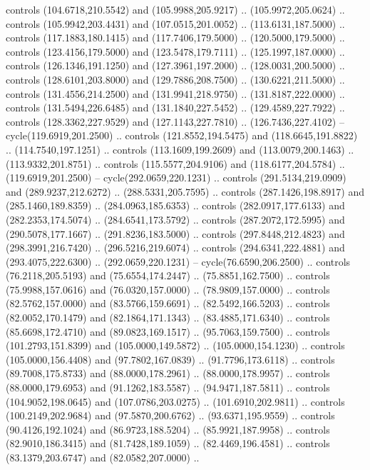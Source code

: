   controls (104.6718,210.5542) and (105.9988,205.9217) .. (105.9972,205.0624) ..
  controls (105.9942,203.4431) and (107.0515,201.0052) .. (113.6131,187.5000) ..
  controls (117.1883,180.1415) and (117.7406,179.5000) .. (120.5000,179.5000) ..
  controls (123.4156,179.5000) and (123.5478,179.7111) .. (125.1997,187.0000) ..
  controls (126.1346,191.1250) and (127.3961,197.2000) .. (128.0031,200.5000) ..
  controls (128.6101,203.8000) and (129.7886,208.7500) .. (130.6221,211.5000) ..
  controls (131.4556,214.2500) and (131.9941,218.9750) .. (131.8187,222.0000) ..
  controls (131.5494,226.6485) and (131.1840,227.5452) .. (129.4589,227.7922) ..
  controls (128.3362,227.9529) and (127.1143,227.7810) .. (126.7436,227.4102) --
  cycle(119.6919,201.2500) .. controls (121.8552,194.5475) and
  (118.6645,191.8822) .. (114.7540,197.1251) .. controls (113.1609,199.2609) and
  (113.0079,200.1463) .. (113.9332,201.8751) .. controls (115.5577,204.9106) and
  (118.6177,204.5784) .. (119.6919,201.2500) -- cycle(292.0659,220.1231) ..
  controls (291.5134,219.0909) and (289.9237,212.6272) .. (288.5331,205.7595) ..
  controls (287.1426,198.8917) and (285.1460,189.8359) .. (284.0963,185.6353) ..
  controls (282.0917,177.6133) and (282.2353,174.5074) .. (284.6541,173.5792) ..
  controls (287.2072,172.5995) and (290.5078,177.1667) .. (291.8236,183.5000) ..
  controls (297.8448,212.4823) and (298.3991,216.7420) .. (296.5216,219.6074) ..
  controls (294.6341,222.4881) and (293.4075,222.6300) .. (292.0659,220.1231) --
  cycle(76.6590,206.2500) .. controls (76.2118,205.5193) and (75.6554,174.2447)
  .. (75.8851,162.7500) .. controls (75.9988,157.0616) and (76.0320,157.0000) ..
  (78.9809,157.0000) .. controls (82.5762,157.0000) and (83.5766,159.6691) ..
  (82.5492,166.5203) .. controls (82.0052,170.1479) and (82.1864,171.1343) ..
  (83.4885,171.6340) .. controls (85.6698,172.4710) and (89.0823,169.1517) ..
  (95.7063,159.7500) .. controls (101.2793,151.8399) and (105.0000,149.5872) ..
  (105.0000,154.1230) .. controls (105.0000,156.4408) and (97.7802,167.0839) ..
  (91.7796,173.6118) .. controls (89.7008,175.8733) and (88.0000,178.2961) ..
  (88.0000,178.9957) .. controls (88.0000,179.6953) and (91.1262,183.5587) ..
  (94.9471,187.5811) .. controls (104.9052,198.0645) and (107.0786,203.0275) ..
  (101.6910,202.9811) .. controls (100.2149,202.9684) and (97.5870,200.6762) ..
  (93.6371,195.9559) .. controls (90.4126,192.1024) and (86.9723,188.5204) ..
  (85.9921,187.9958) .. controls (82.9010,186.3415) and (81.7428,189.1059) ..
  (82.4469,196.4581) .. controls (83.1379,203.6747) and (82.0582,207.0000) ..
